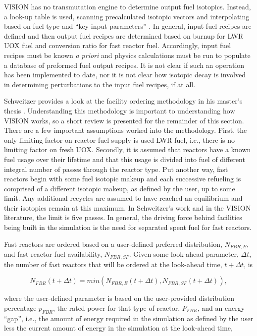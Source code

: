 VISION has no transmutation engine to determine output fuel isotopics. Instead,
a look-up table is used, scanning precalculated isotopic vectors and
interpolating based on fuel type and ``key input parameters''
\cite{jacobson_verifiable_2010}. In general, input fuel recipes are defined and
then output fuel recipes are determined based on burnup for LWR UOX fuel and
conversion ratio for fast reactor fuel. Accordingly, input fuel recipes must be
known \textit{a priori} and physics calculations must be run to populate a
database of preformed fuel output recipes. It is not clear if such an operation
has been implemented to date, nor it is not clear how isotopic decay is involved
in determining perturbations to the input fuel recipes, if at all.

Schweitzer provides a look at the facility ordering methodology in his master's
thesis \cite{schweitzer_improved_2008}. Understanding this methodology is
important to understanding how VISION works, so a short review is presented for
the remainder of this section. There are a few important assumptions worked into
the methodology. First, the only limiting factor on reactor fuel supply is used
LWR fuel, i.e., there is no limiting factor on fresh UOX. Secondly, it is
assumed that reactors have a known fuel usage over their lifetime and that this
usage is divided into fuel of different integral number of passes through the
reactor type. Put another way, fast reactors begin with some fuel isotopic
makeup and each successive refueling is comprised of a different isotopic
makeup, as defined by the user, up to some limit. Any additional recycles are
assumed to have reached an equilibrium and their isotopics remain at this
maximum. In Schweitzer's work and in the VISION literature, the limit is five
passes. In general, the driving force behind facilities being built in the
simulation is the need for separated spent fuel for fast reactors.

Fast reactors are ordered based on a user-defined preferred distribution,
$N_{FBR,E}$, and fast reactor fuel availability, $N_{FBR,SF}$. Given some
look-ahead parameter, $\Delta t$, the number of fast reactors that will be
ordered at the look-ahead time, $t + \Delta t$, is

\begin{equation}
N_{FBR}\left(t+\Delta t\right) = min \left( N_{FBR,E}\left(t+\Delta t\right), N_{FBR,SF}\left(t+\Delta t\right)\right),
\end{equation}

where the user-defined parameter is based on the user-provided distribution
percentage $p_{FBR}$, the rated power for that type of reactor, $P_{FBR}$, and
an energy ``gap'', i.e., the amount of energy required in the simulation as
defined by the user less the current amount of energy in the simulation at the
look-ahead time,

